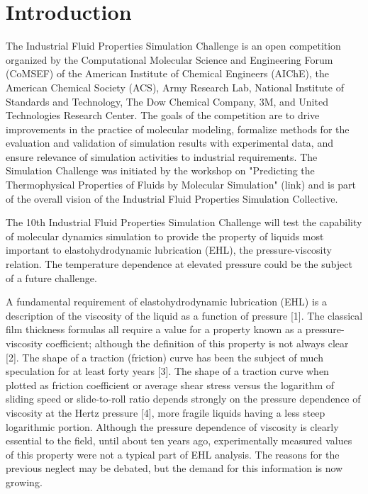 \documentclass[preprint,review,12pt]{elsarticle}
\begin{document}
	\section{Introduction}
	
	The Industrial Fluid Properties Simulation Challenge is an open competition organized by the Computational Molecular Science and Engineering Forum (CoMSEF) of the American Institute of Chemical Engineers (AIChE), the American Chemical Society (ACS), Army Research Lab, National Institute of Standards and Technology, The Dow Chemical Company, 3M, and United Technologies Research Center. The goals of the competition are to drive improvements in the practice of molecular modeling, formalize methods for the evaluation and validation of simulation results with experimental data, and ensure relevance of simulation activities to industrial requirements.  The Simulation Challenge was initiated by the workshop on "Predicting the Thermophysical Properties of Fluids by Molecular Simulation" (link) and is part of the overall vision of the Industrial Fluid Properties Simulation Collective.
	
	The 10th Industrial Fluid Properties Simulation Challenge will test the capability of molecular dynamics simulation to provide the property of liquids most important to elastohydrodynamic lubrication (EHL), the pressure-viscosity relation.  The temperature dependence at elevated pressure could be the subject of a future challenge.
	
	A fundamental requirement of elastohydrodynamic lubrication (EHL) is a description of the viscosity of the liquid as a function of pressure [1].  The classical film thickness formulas all require a value for a property known as a pressure-viscosity coefficient; although the definition of this property is not always clear [2]. The shape of a traction (friction) curve has been the subject of much speculation for at least forty years [3]. The shape of a traction curve when plotted as friction coefficient or average shear stress versus the logarithm of sliding speed or slide-to-roll ratio depends strongly on the pressure dependence of viscosity at the Hertz pressure [4], more fragile liquids having a less steep logarithmic portion. Although the pressure dependence of viscosity is clearly essential to the field, until about ten years ago, experimentally measured values of this property were not a typical part of EHL analysis.  The reasons for the previous neglect may be debated, but the demand for this information is now growing.
	
\end{document}

